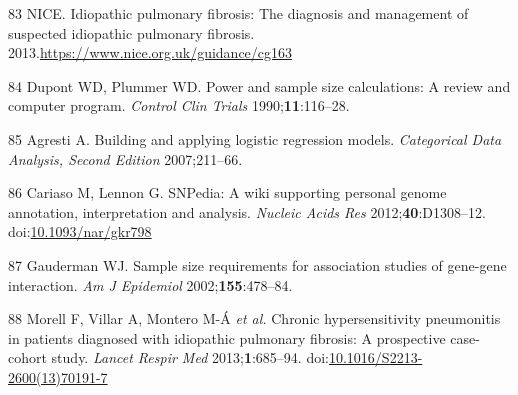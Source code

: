 \documentclass[12pt,a4paper,]{report}
\begin{document}
\leavevmode\hypertarget{ref-NICE2013}{}%
83 NICE. Idiopathic pulmonary fibrosis: The diagnosis and management of
suspected idiopathic pulmonary fibrosis.
2013.\url{https://www.nice.org.uk/guidance/cg163}

\leavevmode\hypertarget{ref-Dupont1990}{}%
84 Dupont WD, Plummer WD. Power and sample size calculations: A review
and computer program. \emph{Control Clin Trials}
1990;\textbf{11}:116--28.

\leavevmode\hypertarget{ref-Agresti2007}{}%
85 Agresti A. Building and applying logistic regression models.
\emph{Categorical Data Analysis, Second Edition} 2007;211--66.

\leavevmode\hypertarget{ref-Cariaso2012}{}%
86 Cariaso M, Lennon G. SNPedia: A wiki supporting personal genome
annotation, interpretation and analysis. \emph{Nucleic Acids Res}
2012;\textbf{40}:D1308--12.
doi:\href{https://doi.org/10.1093/nar/gkr798}{10.1093/nar/gkr798}

\leavevmode\hypertarget{ref-Gauderman2002}{}%
87 Gauderman WJ. Sample size requirements for association studies of
gene-gene interaction. \emph{Am J Epidemiol} 2002;\textbf{155}:478--84.

\leavevmode\hypertarget{ref-Morell2013}{}%
88 Morell F, Villar A, Montero M-Á \emph{et al.} Chronic
hypersensitivity pneumonitis in patients diagnosed with idiopathic
pulmonary fibrosis: A prospective case-cohort study. \emph{Lancet Respir
Med} 2013;\textbf{1}:685--94.
doi:\href{https://doi.org/10.1016/S2213-2600(13)70191-7}{10.1016/S2213-2600(13)70191-7}
\end{document}
